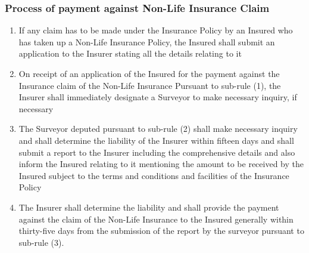 \subsubsection{Process of payment against Non-Life Insurance Claim}
\begin{enumerate}
	\item  If any claim has to be made under the Insurance Policy by an Insured who has taken up a Non-Life Insurance Policy, the Insured shall submit an application to the Insurer stating all the details relating to it
	\item On receipt of an application of the Insured for the payment against the Insurance claim of the Non-Life Insurance Pursuant to sub-rule (1), the Insurer shall immediately designate a Surveyor to make necessary inquiry, if necessary
	\item The Surveyor deputed pursuant to sub-rule (2) shall make necessary inquiry and shall determine the liability of the Insurer within fifteen days and shall submit a report to the Insurer including the comprehensive details and also inform the Insured relating to it mentioning the amount to be received by the Insured subject to the terms and conditions
	and facilities of the Insurance Policy
	\item The Insurer shall determine the liability and shall provide the payment against the claim of the Non-Life Insurance to the Insured generally within thirty-five days from the submission of the report by the surveyor pursuant to sub-rule (3).
\end{enumerate}